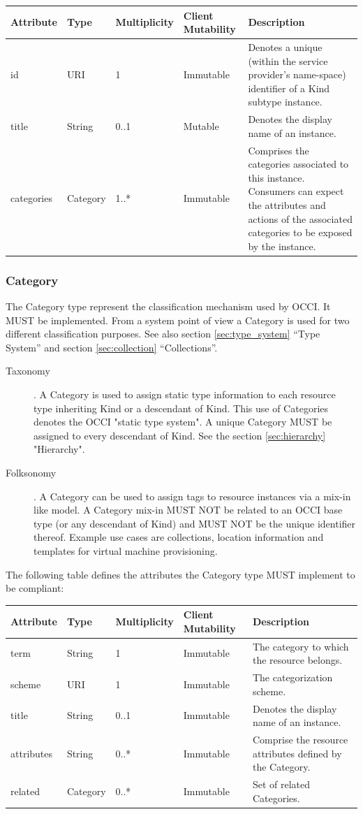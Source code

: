 \documentclass[10pt,a4paper]{article}
\begin{document}
\begin{tabular}{l|l|l|l|p{2.7in}}
Attribute & Type & Multiplicity & Client Mutability & Description \\
\hline
id & URI & 1 & Immutable & Denotes a unique (within the service provider's name-space) identifier of a Kind subtype instance. \\
title & String & 0..1 & Mutable & Denotes the display name of an instance. \\
categories & Category & 1..* & Immutable & Comprises the categories associated to this instance. Consumers can expect the attributes and actions of the associated categories to be exposed by the instance. \\
\end{tabular}

\subsubsection{Category}
The Category type represent the classification mechanism used by OCCI. It MUST be implemented. From a system point of view a Category is used for two different classification purposes. See also section \ref{sec:type_system} ``Type System'' and section \ref{sec:collection} ``Collections''.

\begin{description}
\item[Taxonomy]. A Category is used to assign static type information to each resource type inheriting Kind or a descendant of Kind. This use of Categories denotes the OCCI "static type system". A unique Category MUST be assigned to every descendant of Kind. See the section \ref{sec:hierarchy} "Hierarchy".
\item[Folksonomy]. A Category can be used to assign tags to resource instances via a mix-in like model. A Category mix-in MUST NOT be related to an OCCI base type (or any descendant of Kind) and MUST NOT be the unique identifier thereof. Example use cases are collections, location information and templates for virtual machine provisioning.
\end{description}

The following table defines the attributes the Category type MUST implement to be compliant:

\begin{tabular}{l|l|l|l|p{2.7in}}
Attribute & Type & Multiplicity & Client Mutability & Description \\
\hline
term & String & 1 & Immutable & The category to which the resource belongs. \\
scheme & URI & 1 & Immutable & The categorization scheme. \\
title & String & 0..1 & Immutable & Denotes the display name of an instance. \\
attributes & String & 0..* & Immutable & Comprise the resource attributes defined by the Category. \\
related & Category & 0..* & Immutable & Set of related Categories. \\
\end{tabular}
\end{document}
